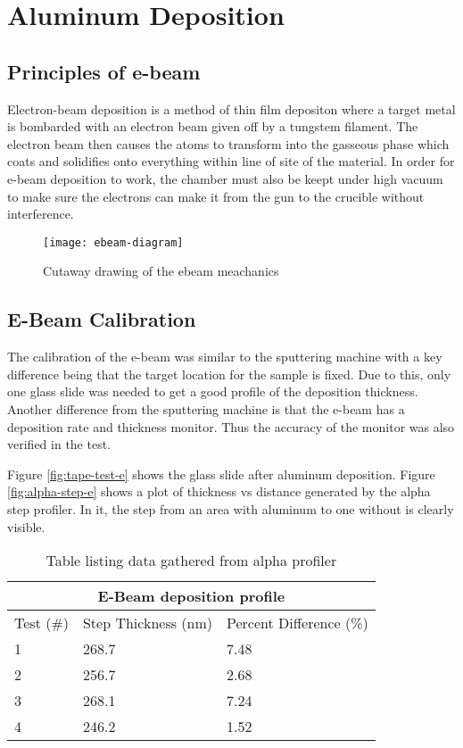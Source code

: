 
\section{Aluminum Deposition}
\subsection{Principles of e-beam}
Electron-beam deposition is a method of thin film depositon where a target metal is bombarded with an electron beam given off by a tungstem filament.
The electron beam then causes the atoms to transform into the gasseous phase which coats and solidifies onto everything within line of site of the material.
In order for e-beam deposition to work, the chamber must also be keept under high vacuum to make sure the electrons can make it from the gun to the crucible without interference.
\begin{figure}[htpb]
\centering
\texttt{[image: ebeam-diagram]}
\caption{Cutaway drawing of the ebeam meachanics}
\label{fig:ebeam-diagram}
\end{figure}

\subsection{E-Beam Calibration}
The calibration of the e-beam was similar to the sputtering machine with a key difference being that the target location for the sample is fixed.
Due to this, only one glass slide was needed to get a good profile of the deposition thickness.
Another difference from the sputtering machine is that the e-beam has a deposition rate and thickness monitor.
Thus the accuracy of the monitor was also verified in the test.

Figure \ref{fig:tape-test-e} shows the glass slide after aluminum deposition.
Figure \ref{fig:alpha-step-e} shows a plot of thickness vs distance generated by the alpha step profiler.
In it, the step from an area with aluminum to one without is clearly visible.

\begin{table}[htpb]
\centering
\begin{tabular}{ |p{4cm}|p{4cm}|p{4cm}|  }
 \hline
 \multicolumn{3}{|c|}{E-Beam deposition profile} \\
 \hline
 Test (\#)&Step Thickness (nm)&Percent Difference (\%)\\
 \hline
 1   & 268.7    &7.48\\
 2&   256.7  & 2.68\\
 3 &268.1 & 7.24\\
 4    &246.2 & 1.52\\
 \hline
\end{tabular}
\caption{Table listing data gathered from alpha profiler}
\label{table:test-e}
\end{table}


